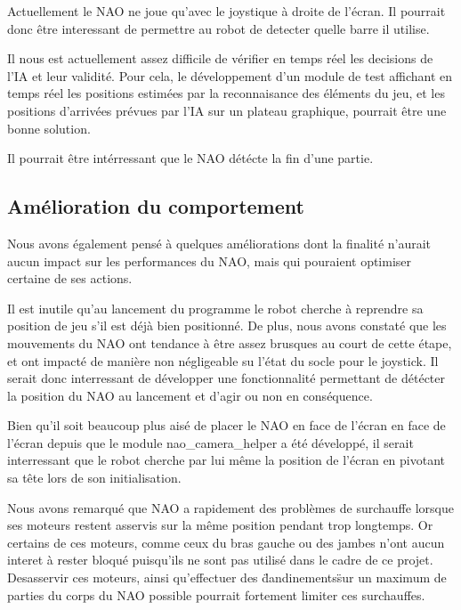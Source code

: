     \par Actuellement le NAO ne joue qu'avec le joystique à droite de l'écran.
    Il pourrait donc être interessant de permettre au robot de detecter quelle barre il utilise. \\

    \par Il nous est actuellement assez difficile de vérifier en temps réel les decisions de l'IA et leur validité.
    Pour cela, le développement d'un module de test affichant en temps réel les positions estimées par la reconnaisance des éléments du jeu, et les positions d'arrivées prévues par l'IA sur un plateau graphique, pourrait être une bonne solution.

    \par Il pourrait être intérressant que le NAO détécte la fin d'une partie.


  \subsection{Amélioration du comportement}
  \label{sub:Amélioration du comportement}
    \par Nous avons également pensé à quelques améliorations dont la finalité n'aurait aucun impact sur les performances du NAO, mais qui pouraient optimiser certaine de ses actions.\\

    \par Il est inutile qu'au lancement du programme le robot cherche à reprendre sa position de jeu s'il est déjà bien positionné.
    De plus, nous avons constaté que les mouvements du NAO ont tendance à être assez brusques au court de cette étape, et ont impacté de manière non négligeable su l'état du socle pour le joystick.
    Il serait donc interressant de développer une fonctionnalité permettant de détécter la position du NAO au lancement et d'agir ou non en conséquence.\\

    \par Bien qu'il soit beaucoup plus aisé de placer le NAO en face de l'écran en face de l'écran depuis que le module nao\_camera\_helper a été développé,
    il serait interressant que le robot cherche par lui même la position de l'écran en pivotant sa tête lors de son initialisation.\\

    \par Nous avons remarqué que NAO a rapidement des problèmes de surchauffe lorsque ses moteurs restent asservis sur la même position pendant trop longtemps.
    Or certains de ces moteurs, comme ceux du bras gauche ou des jambes n'ont aucun interet à rester bloqué puisqu'ils ne sont pas utilisé dans le cadre de ce projet.
    Desasservir ces moteurs, ainsi qu'effectuer des \"dandinements\" sur un maximum de parties du corps du NAO possible pourrait fortement limiter ces surchauffes.
\pagebreak
